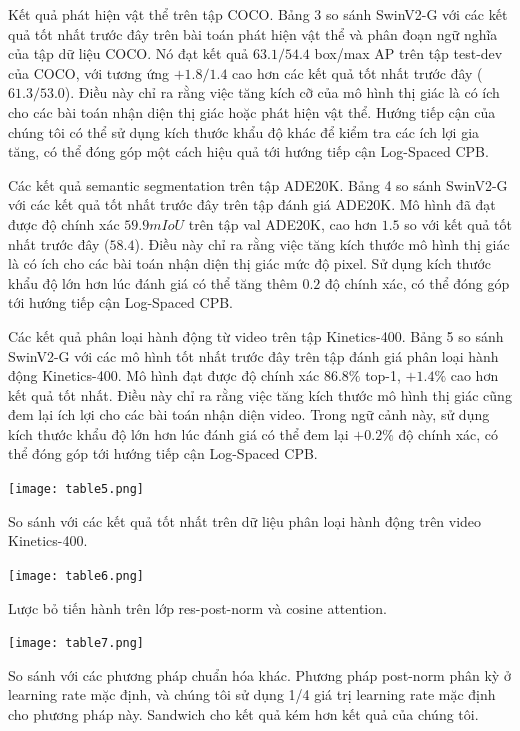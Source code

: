 \documentclass[times, twocolumn]{zHenriquesLab-StyleBioRxiv}
\begin{document}
Kết quả phát hiện vật thể trên tập COCO. Bảng 3 so sánh SwinV2-G với các kết quả tốt nhất trước đây trên bài toán phát hiện vật thể và phân đoạn ngữ nghĩa của tập dữ liệu COCO. Nó đạt kết quả $63.1/54.4$ box/max AP trên tập test-dev của COCO, với tương ứng $+1.8/1.4$ cao hơn các kết quả tốt nhất trước đây ($61.3/53.0$). Điều này chỉ ra rằng việc tăng kích cỡ của mô hình thị giác là có ích cho các bài toán nhận diện thị giác hoặc phát hiện vật thể. Hướng tiếp cận của chúng tôi có thể sử dụng kích thước khẩu độ khác để kiểm tra các ích lợi gia tăng, có thể đóng góp một cách hiệu quả tới hướng tiếp cận Log-Spaced CPB.

Các kết quả semantic segmentation trên tập ADE20K. Bảng 4 so sánh SwinV2-G với các kết quả tốt nhất trước đây trên tập đánh giá ADE20K. Mô hình đã đạt được độ chính xác $59.9 mIoU$ trên tập val ADE20K,  cao hơn $1.5$ so với kết quả tốt nhất trước đây ($58.4$). Điều này chỉ ra rằng việc tăng kích thước mô hình thị giác là có ích cho các bài toán nhận diện thị giác mức độ pixel. Sử dụng kích thước khẩu độ lớn hơn lúc đánh giá có thể tăng thêm $0.2$ độ chính xác, có thể đóng góp tới hướng tiếp cận Log-Spaced CPB.

Các kết quả phân loại hành động từ video trên tập Kinetics-400. Bảng 5 so sánh SwinV2-G với các mô hình tốt nhất trước đây trên tập đánh giá phân loại hành động Kinetics-400. Mô hình đạt được độ chính xác $86.8\%$ top-1, $+1.4\%$ cao hơn kết quả tốt nhất. Điều này chỉ ra rằng việc tăng kích thước mô hình thị giác cũng đem lại ích lợi cho các bài toán nhận diện video. Trong ngữ cảnh này, sử dụng kích thước khẩu độ lớn hơn lúc đánh giá có thể đem lại $+0.2\%$ độ chính xác, có thể đóng góp tới hướng tiếp cận Log-Spaced CPB.


\begin{table}[!ht]
    \centering
    \texttt{[image: table5.png]}
    \caption{So sánh với các kết quả tốt nhất trên dữ liệu phân loại hành động trên video Kinetics-400.}
\end{table}

\begin{table}[!ht]
    \centering
    \texttt{[image: table6.png]}
    \caption{Lược bỏ tiến hành trên lớp res-post-norm và cosine attention.}
\end{table}

\begin{table}[!ht]
    \centering
    \texttt{[image: table7.png]}
    \caption{So sánh với các phương pháp chuẩn hóa khác. Phương pháp post-norm phân kỳ ở learning rate mặc định, và chúng tôi sử dụng 1/4 giá trị learning rate mặc định cho phương pháp này. Sandwich cho kết quả kém hơn kết quả của chúng tôi.}
\end{table}
\end{document}
